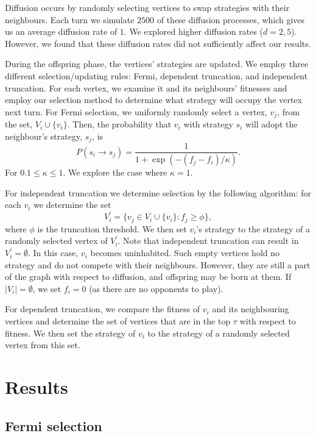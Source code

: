 \documentclass[reprint,aps,pre,twocolumn]{revtex4-1}
\begin{document}
Diffusion occurs by randomly selecting vertices to swap strategies with their neighbours. Each turn we simulate $2500$ of these diffusion processes, which gives us an average diffusion rate of $1$. We explored higher diffusion rates ($d= 2, 5$). However, we found that these diffusion rates did not sufficiently affect our results.

During the offspring phase, the vertices' strategies are updated. We employ three different selection/updating rules: Fermi, dependent truncation, and independent truncation. For each vertex, we examine it and its neighbours' fitnesses and employ our selection method to determine what strategy will occupy the vertex next turn. For Fermi selection, we uniformly randomly select a vertex, $v_j$, from the set, $V_i \cup \{v_i\}$. Then, the probability that $v_i$ with strategy $s_i$ will adopt the neighbour's strategy, $s_j$, is
\begin{equation}
P(s_i \rightarrow s_j) = \frac{1}{1 + \exp(-(f_j-f_i)/\kappa)}.
\end{equation}
\noindent For $0.1 \leq \kappa \leq 1$. We explore the case where $\kappa = 1$.

For independent truncation we determine selection by the following algorithm: for each $v_i$ we determine the set
\begin{equation}
V_i^\prime = \{ v_j \in V_i \cup \{v_i\} : f_j \geq \phi \},
\end{equation}
\noindent where $\phi$ is the truncation threshold. We then set $v_i$'s strategy to the strategy of a randomly selected vertex of $V_i^\prime$. Note that independent truncation can result in $V_i^\prime = \emptyset$. In this case, $v_i$ becomes uninhabited. Such empty vertices hold no strategy and do not compete with their neighbours. However, they are still a part of the graph with respect to diffusion, and offspring may be born at them. If $|V_i| = \emptyset$, we set $f_i=0$ (as there are no opponents to play).

For dependent truncation, we compare the fitness of $v_i$ and its neighbouring vertices and determine the set of vertices that are in the top $\tau$ with respect to fitness. We then set the strategy of $v_i$ to the strategy of a randomly selected vertex from this set.

\section{\label{sec:level3}Results}

\subsection{Fermi selection}
\end{document}

